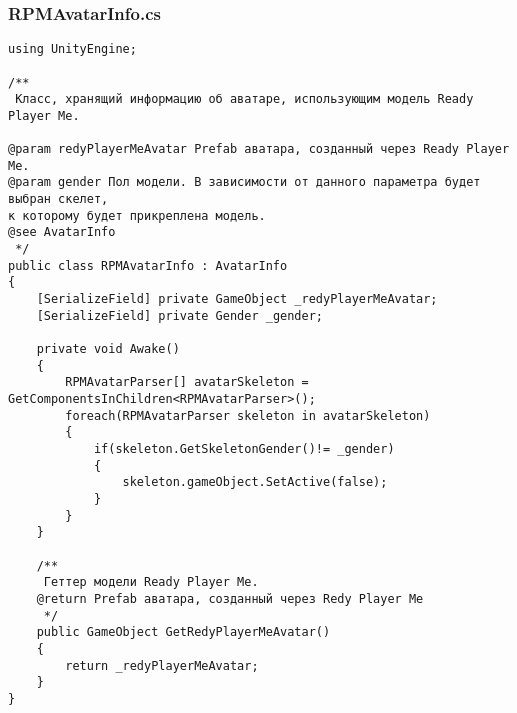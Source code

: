 \subsubsection*{RPMAvatarInfo.cs}
\begin{verbatim}
﻿using UnityEngine;

/**
 Класс, хранящий информацию об аватаре, использующим модель Ready Player Me.

@param redyPlayerMeAvatar Prefab аватара, созданный через Ready Player Me.
@param gender Пол модели. В зависимости от данного параметра будет выбран скелет, 
к которому будет прикреплена модель.
@see AvatarInfo
 */
public class RPMAvatarInfo : AvatarInfo
{
    [SerializeField] private GameObject _redyPlayerMeAvatar;
    [SerializeField] private Gender _gender;

    private void Awake()  
    {
        RPMAvatarParser[] avatarSkeleton = GetComponentsInChildren<RPMAvatarParser>();
        foreach(RPMAvatarParser skeleton in avatarSkeleton)
        {
            if(skeleton.GetSkeletonGender()!= _gender)
            {
                skeleton.gameObject.SetActive(false);
            }
        }
    }

    /**
     Геттер модели Ready Player Me.
    @return Prefab аватара, созданный через Redy Player Me
     */
    public GameObject GetRedyPlayerMeAvatar()
    {
        return _redyPlayerMeAvatar;
    }
}

\end{verbatim}
